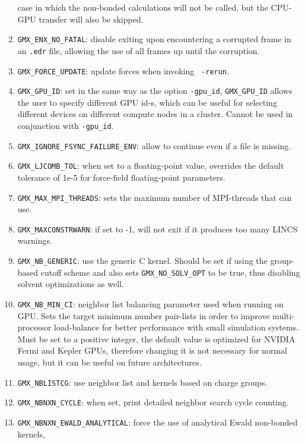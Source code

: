 \begin{enumerate}
        case in which the non-bonded calculations will not be called, but the CPU-GPU transfer will also be skipped.
\item   {\tt GMX_ENX_NO_FATAL}: disable exiting upon encountering a corrupted frame in an {\tt .edr}
        file, allowing the use of all frames up until the corruption.
\item   {\tt GMX_FORCE_UPDATE}: update forces when invoking {\tt {} -rerun}.
\item   {\tt GMX_GPU_ID}: set in the same way as the {\tt {}} option {\tt -gpu_id}, {\tt GMX_GPU_ID}
        allows the user to specify different GPU id-s, which can be useful for selecting different
        devices on different compute nodes in a cluster.  Cannot be used in conjunction with {\tt -gpu_id}.
\item   {\tt GMX_IGNORE_FSYNC_FAILURE_ENV}: allow {\tt {}} to continue even if
        a file is missing.
\item   {\tt GMX_LJCOMB_TOL}: when set to a floating-point value, overrides the default tolerance of
        1e-5 for force-field floating-point parameters.
\item   {\tt GMX_MAX_MPI_THREADS}: sets the maximum number of MPI-threads that {\tt {}}
        can use.
\item   {\tt GMX_MAXCONSTRWARN}: if set to -1, {\tt {}} will
        not exit if it produces too many LINCS warnings.
\item   {\tt GMX_NB_GENERIC}: use the generic C kernel.  Should be set if using
        the group-based cutoff scheme and also sets {\tt GMX_NO_SOLV_OPT} to be true,
        thus disabling solvent optimizations as well.
\item   {\tt GMX_NB_MIN_CI}: neighbor list balancing parameter used when running on GPU. Sets the
        target minimum number pair-lists in order to improve multi-processor load-balance for better
        performance with small simulation systems. Must be set to a positive integer, the default value
        is optimized for NVIDIA Fermi and Kepler GPUs, therefore changing it is not necessary for
        normal usage, but it can be useful on future architectures.
\item   {\tt GMX_NBLISTCG}: use neighbor list and kernels based on charge groups.
\item   {\tt GMX_NBNXN_CYCLE}: when set, print detailed neighbor search cycle counting.
\item   {\tt GMX_NBNXN_EWALD_ANALYTICAL}: force the use of analytical Ewald non-bonded kernels,

\end{enumerate}
